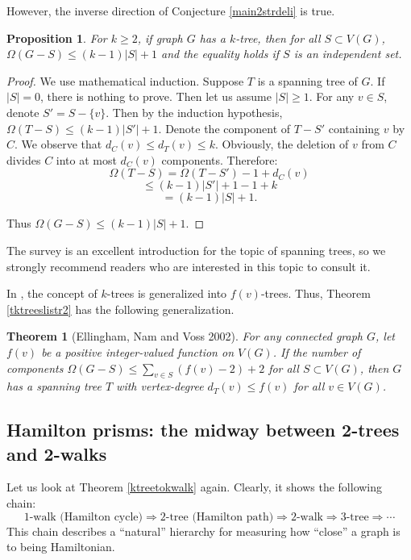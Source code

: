 \documentclass[12pt]{report}
\newtheorem{theorem}{Theorem}
\newtheorem{proposition}{Proposition}
\begin{document}
However, the inverse direction of Conjecture \ref{main2strdeli} is true.

\begin{proposition}{\cite[Proposition 5]{ozeki2011spanning}}
For $k\ge2$, if graph $G$ has a $k$-tree, then for all $S\subset V(G)$, $\Omega(G-S)\le(k-1)|S|+1$ and the equality holds if $S$ is an independent set.
\end{proposition}


\begin{proof}
We use mathematical induction. Suppose $T$ is a spanning tree of $G$. If $|S|=0$, there is nothing to prove. Then let us assume $|S|\ge1$. For any $v\in S$, denote $S'=S-\{v\}$. Then by the induction hypothesis, $\Omega(T-S)\le(k-1)|S'|+1$. Denote the component of $T-S'$ containing $v$ by $C$. We observe that $d_C(v)\le d_T(v)\le k$. Obviously, the deletion of $v$ from $C$ divides $C$ into at most $d_C(v)$ components. Therefore:
$$\Omega(T-S)=\Omega(T-S')-1+d_C(v)$$
$$\le(k-1)|S'|+1-1+k$$
$$=(k-1)|S|+1.$$

Thus $\Omega(G-S)\le(k-1)|S|+1.$
\end{proof}





The survey \cite{ozeki2011spanning} is an excellent introduction for the topic of spanning trees, so we strongly recommend readers who are interested in this topic to consult it.

In \cite{ellingham2002connected}, the concept of $k$-trees is generalized into $f(v)$-trees. Thus, Theorem \ref{tktreeslistr2} has the following generalization.
\begin{theorem}[Ellingham, Nam and Voss 2002]\label{tftreeslistr3}
For any connected graph $G$, let $f(v)$ be a positive integer-valued function on $V(G)$. If the number of components $\Omega(G-S)\le\sum_{v\in S}(f(v)-2)+2$ for all $S\subset V(G)$, then $G$ has a spanning tree $T$ with vertex-degree $d_T(v)\le f(v)$ for all $v\in V(G)$.
\end{theorem}

\subsection{Hamilton prisms: the midway between 2-trees and 2-walks}
Let us look at Theorem \ref{ktreetokwalk} again. Clearly, it shows the following chain:
$$\text{1-walk (Hamilton cycle)}\Rightarrow\text{2-tree (Hamilton path)}\Rightarrow\text{2-walk}\Rightarrow\text{3-tree}\Rightarrow\cdots$$
This chain describes a ``natural'' hierarchy for measuring how ``close'' a graph is to being Hamiltonian.
\end{document}
